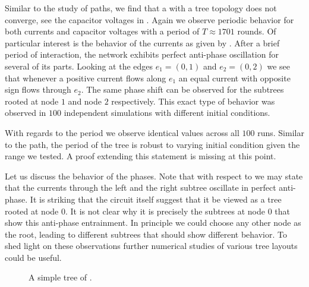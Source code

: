 		Similar to the study of paths, we find that a \Pn with a tree topology does not converge, see the capacitor voltages in . Again we observe periodic behavior for both currents and capacitor voltages with a period of $T \approx 1701$ rounds. Of particular interest is the behavior of the currents as given by . After a brief period of interaction, the network exhibits perfect anti-phase oscillation for several of its parts. Looking at the edges $e_1 = (0,1)$ and $e_2 = (0,2)$ we see that whenever a positive current flows along $e_1$ an equal current with opposite sign flows through $e_2$. The same phase shift can be observed for the subtrees rooted at node $1$ and node $2$ respectively. This exact type of behavior was observed in $100$ independent simulations with different initial conditions.

		With regards to the period we observe identical values across all $100$ runs. Similar to the path, the period of the tree is robust to varying initial condition given the range we tested. A proof extending this statement is missing at this point.

		Let us discuss the behavior of the phases. Note that with respect to  we may state that the currents through the left and the right subtree oscillate in perfect anti-phase. It is striking that the circuit itself suggest that it be viewed as a tree rooted at node $0$. It is not clear why it is precisely the subtrees at node $0$ that show this anti-phase entrainment. In principle we could choose any other node as the root, leading to different subtrees that should show different behavior. To shed light on these observations further numerical studies of various tree layouts could be useful.

		\begin{figure}
			\centering
			\qquad
			\newline
			\qquad
			
					
			\caption[Simulation - Trees]{A simple tree of \Pes.}
			\label{fig:tree}
		\end{figure}

